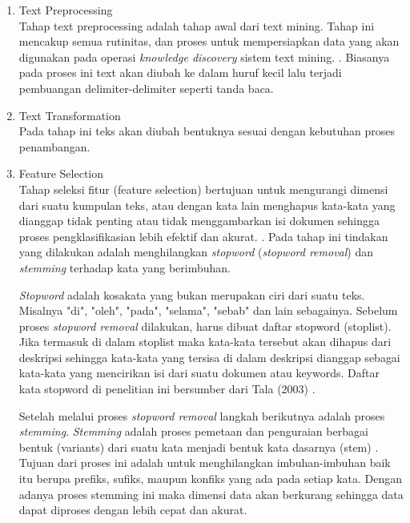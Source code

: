 \begin{enumerate}
	\item Text Preprocessing\\
	Tahap text preprocessing adalah tahap awal dari text mining. Tahap ini mencakup semua rutinitas, dan proses untuk mempersiapkan data yang akan digunakan pada operasi \textit{knowledge discovery} sistem text mining. \cite{feldman2007text}. Biasanya pada proses ini text akan diubah ke dalam huruf kecil lalu terjadi pembuangan delimiter-delimiter seperti tanda baca.
	
	\item Text Transformation\\
	Pada tahap ini teks akan diubah bentuknya sesuai dengan kebutuhan proses penambangan.
	
	\item Feature Selection\\
	Tahap seleksi fitur (feature selection) bertujuan untuk mengurangi dimensi dari suatu kumpulan teks, atau dengan kata lain menghapus kata-kata yang dianggap tidak penting atau tidak menggambarkan isi dokumen sehingga proses pengklasifikasian lebih efektif dan akurat. \cite{manalu2014analisis}. Pada tahap ini tindakan yang dilakukan adalah menghilangkan \textit{stopword} (\textit{stopword removal}) dan \textit{stemming} terhadap kata yang berimbuhan.\cite{berry2010text}
	
	\textit{Stopword} adalah kosakata yang bukan merupakan ciri dari suatu teks. Misalnya "di", "oleh", "pada", "selama", "sebab" dan lain sebagainya. Sebelum proses \textit{stopword removal} dilakukan, harus dibuat daftar stopword (stoplist). Jika termasuk di dalam stoplist maka kata-kata tersebut akan dihapus dari deskripsi sehingga kata-kata yang tersisa di dalam deskripsi dianggap sebagai kata-kata yang mencirikan isi dari suatu dokumen atau keywords. Daftar kata stopword di penelitian ini bersumber dari Tala (2003) \cite{tala2003study}.
	
	Setelah melalui proses \textit{stopword removal} langkah berikutnya adalah proses \textit{stemming}. \textit{Stemming} adalah proses pemetaan dan penguraian berbagai bentuk (variants) dari suatu kata menjadi bentuk kata dasarnya (stem) \cite{tala2003study}. Tujuan dari proses ini adalah untuk menghilangkan imbuhan-imbuhan baik itu berupa prefiks, sufiks, maupun konfiks yang ada pada setiap kata. \cite{manalu2014analisis} Dengan adanya proses stemming ini maka dimensi data akan berkurang sehingga data dapat diproses dengan lebih cepat dan akurat.
\end{enumerate}


